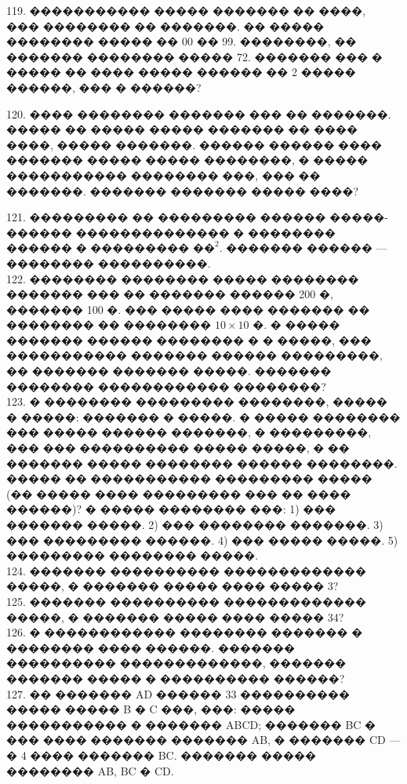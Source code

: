 \documentclass[12pt]{article}
\begin{document}
119. ����������� ����� ������� �� ����, ��� �������� �� �������. �� ����� �������� ����� �� 00 �� 99. ��������, �� ������� �������� ����� 72. ������� ��� � ����� �� ���� ����� ������ �� 2 ����� ������, ��� � ������?
\begin{center}
\begin{figure}[ht!]
\end{figure}
\end{center}
120. ���� �������� ������� ��� �� �������. ����� �� ����� ����� ������� �� ���� ����, ����� �������. ������ ������ ���� ������� ����� ����� ��������, � ����� ����������� �������� ���, ��� �� �������. ������� ������� ����� ����?
\begin{center}
\begin{figure}[ht!]
\end{figure}
\end{center}
121. ��������� �� ��������� ������ �����-������ �������������� � �������� ������ � ��������� $\text{��}^2.$ ������� ������ --- �������� ����������.\\
122. �������� �������� ����� �������� ������� ��� �� ������� ������ 200 �, ������� 100 �. ��� ����� ���� ������� �� �������� �� �������� $10\times10$ �. � ����� ������� ������ �������� � � �����, ��� ����������� ������� ������ ���������, �� ������� ������� �����. ������� �������� ������������ ��������?\\
123. � �������� ��������� ��������, ����� � �����: ������� � �����. � ����� �������� ��� ����� ������ �������, � ���������, ��� ��� ���������� ����� �����, � �� ������� ����� �������� ������ ��������. ����� �� ����������� ��������� ����� (�� ����� ���� ��������� ��� �� ���� ������)? � ����� �������� ���: 1) ��� ������� �����. 2) ��� �������� �������. 3) ��� ��������� ������. 4) ��� ����� �����. 5) ��������� �������� �����.\\
124. ������� ���������� ������������� �����, � ������� ����� ���� ����� 3?\\
125. ������� ���������� ������������� �����, � ������� ����� ���� ����� 34?\\
126. � ������������ �������� ������� � �������� ���� ������. ������� ���������� �������������, ������� ������� ����� � ���������� ������?\\
127. �� ������� AD ������ 33 ���������� ����� ����� B � C ���, ���: ����� ����������� � ������� ABCD; ������� BC � ��� ���� ������� ������� AB, � ������� CD --- � 4 ���� ������� BC. ������� ����� �������� AB, BC � CD.\\
\end{document}
